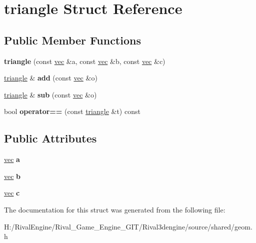 \hypertarget{structtriangle}{}\section{triangle Struct Reference}
\label{structtriangle}
\subsection*{Public Member Functions}
\begin{DoxyCompactItemize}
\item 
\mbox{\label{structtriangle_a16efad8100f56d494dcdb7024a8319fd}} 
{\bfseries triangle} (const \hyperlink{structvec}{vec} \&a, const \hyperlink{structvec}{vec} \&b, const \hyperlink{structvec}{vec} \&c)
\item 
\mbox{\label{structtriangle_ab265c5fdfa2bbd0da2c93ca34737e00e}} 
\hyperlink{structtriangle}{triangle} \& {\bfseries add} (const \hyperlink{structvec}{vec} \&o)
\item 
\mbox{\label{structtriangle_a5e5b4d73a695ea61aafc24d801638af9}} 
\hyperlink{structtriangle}{triangle} \& {\bfseries sub} (const \hyperlink{structvec}{vec} \&o)
\item 
\mbox{\label{structtriangle_a3fee918dd861991f6345ee518d367616}} 
bool {\bfseries operator==} (const \hyperlink{structtriangle}{triangle} \&t) const
\end{DoxyCompactItemize}
\subsection*{Public Attributes}
\begin{DoxyCompactItemize}
\item 
\mbox{\label{structtriangle_a0952e8f2b60d4fcf31b561208ae70eac}} 
\hyperlink{structvec}{vec} {\bfseries a}
\item 
\mbox{\label{structtriangle_a08e24c9eb157f05efec1f3440947f29d}} 
\hyperlink{structvec}{vec} {\bfseries b}
\item 
\mbox{\label{structtriangle_ad3da96092f8443bec94c7e2582d6b465}} 
\hyperlink{structvec}{vec} {\bfseries c}
\end{DoxyCompactItemize}


The documentation for this struct was generated from the following file\+:\begin{DoxyCompactItemize}
\item 
H\+:/\+Rival\+Engine/\+Rival\+\_\+\+Game\+\_\+\+Engine\+\_\+\+G\+I\+T/\+Rival3dengine/source/shared/geom.\+h\end{DoxyCompactItemize}

